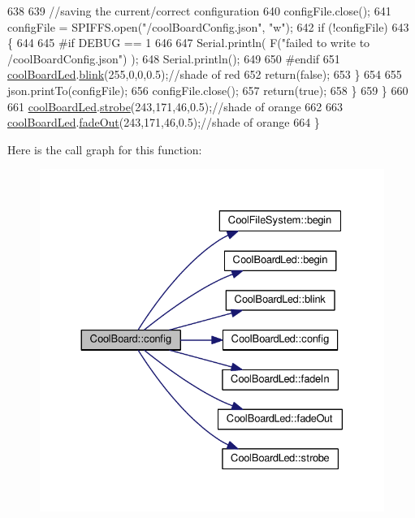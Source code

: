 \begin{DoxyCode}
638 
639             \textcolor{comment}{//saving the current/correct configuration}
640             configFile.close();
641             configFile = SPIFFS.open(\textcolor{stringliteral}{"/coolBoardConfig.json"}, \textcolor{stringliteral}{"w"});
642             \textcolor{keywordflow}{if} (!configFile)
643             \{
644             
645 \textcolor{preprocessor}{            #if DEBUG == 1}
646 
647                 Serial.println( F(\textcolor{stringliteral}{"failed to write to /coolBoardConfig.json"}) );
648                 Serial.println();
649             
650 \textcolor{preprocessor}{            #endif}
651                 \hyperlink{classCoolBoard_a1b1d3c684a5baa56b08486e192fd8e97}{coolBoardLed}.\hyperlink{classCoolBoardLed_a96e1ea13003eee34c9dbcef340404426}{blink}(255,0,0,0.5);\textcolor{comment}{//shade of red     }
652                 \textcolor{keywordflow}{return}(\textcolor{keyword}{false});
653             \}
654 
655             json.printTo(configFile);
656             configFile.close();
657             \textcolor{keywordflow}{return}(\textcolor{keyword}{true});
658         \}
659     \}
660 
661     \hyperlink{classCoolBoard_a1b1d3c684a5baa56b08486e192fd8e97}{coolBoardLed}.\hyperlink{classCoolBoardLed_ad5f0de4c628cbfbf49896042831c64ad}{strobe}(243,171,46,0.5);\textcolor{comment}{//shade of orange}
662     
663     \hyperlink{classCoolBoard_a1b1d3c684a5baa56b08486e192fd8e97}{coolBoardLed}.\hyperlink{classCoolBoardLed_a93d545679237e8cc858324367149775c}{fadeOut}(243,171,46,0.5);\textcolor{comment}{//shade of orange               }
664 \}
\end{DoxyCode}
Here is the call graph for this function\+:\nopagebreak
\begin{figure}[H]
\begin{center}
\leavevmode
\includegraphics[width=330pt]{classCoolBoard_a583a874c09c07e70a6eb9229fc4beddb_cgraph}
\end{center}
\end{figure}
\mbox{\label{classCoolBoard_a519de78b807f8ec6463ff484eb925918}} 
